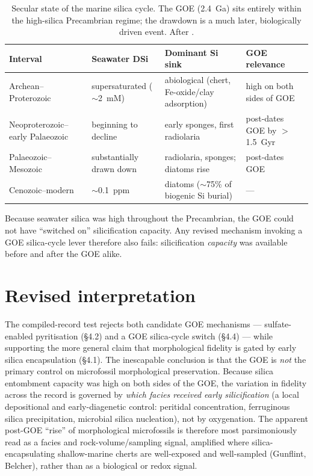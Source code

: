 \documentclass[11pt]{article}
\begin{document}
\begin{table}[t]
\centering\small
\caption{Secular state of the marine silica cycle. The GOE (2.4~Ga) sits entirely within the
high-silica Precambrian regime; the drawdown is a much later, biologically driven event.
After \citep{Siever1992,Perry2003,ESR2023Si}.}
\label{tab:sicycle}
\begin{tabular}{llll}
\toprule
Interval & Seawater DSi & Dominant Si sink & GOE relevance \\
\midrule
Archean--Proterozoic & supersaturated ($\sim$2~mM) & abiological (chert, Fe-oxide/clay adsorption) & high on both sides of GOE \\
Neoproterozoic--early Palaeozoic & beginning to decline & early sponges, first radiolaria & post-dates GOE by $>$1.5~Gyr \\
Palaeozoic--Mesozoic & substantially drawn down & radiolaria, sponges; diatoms rise & post-dates GOE \\
Cenozoic--modern & $\sim$0.1~ppm & diatoms ($\sim$75\% of biogenic Si burial) & --- \\
\bottomrule
\end{tabular}
\end{table}

Because seawater silica was high throughout the Precambrian, the GOE could not have ``switched on''
silicification capacity. Any revised mechanism invoking a GOE silica-cycle lever therefore also
fails: silicification \emph{capacity} was available before and after the GOE alike.

\section{Revised interpretation}

The compiled-record test rejects both candidate GOE mechanisms --- sulfate-enabled pyritisation
(\S4.2) and a GOE silica-cycle switch (\S4.4) --- while supporting the more general claim that
morphological fidelity is gated by early silica encapsulation (\S4.1). The inescapable conclusion is
that the GOE is \emph{not} the primary control on microfossil morphological preservation. Because
silica entombment capacity was high on both sides of the GOE, the variation in fidelity across the
record is governed by \emph{which facies received early silicification} (a local depositional and
early-diagenetic control: peritidal concentration, ferruginous silica precipitation, microbial
silica nucleation), not by oxygenation. The apparent post-GOE ``rise'' of morphological microfossils
is therefore most parsimoniously read as a facies and rock-volume/sampling signal, amplified where
silica-encapsulating shallow-marine cherts are well-exposed and well-sampled (Gunflint, Belcher),
rather than as a biological or redox signal.
\end{document}
